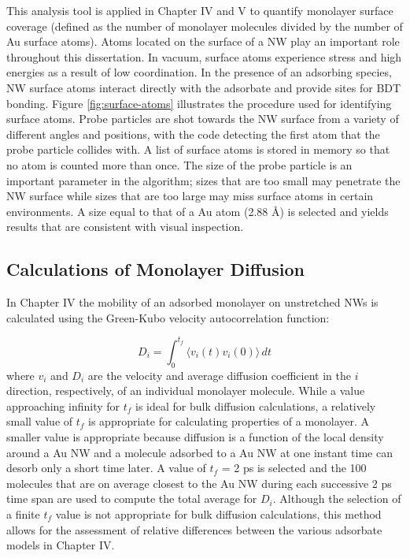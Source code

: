 \documentclass[10pt]{report}  %
\newcommand\findent{\hspace*{\parindent}}
\begin{document}
\findent This analysis tool is applied in Chapter IV and V to quantify monolayer surface coverage (defined as the number of monolayer molecules divided by the number of Au surface atoms). Atoms located on the surface of a NW play an important role throughout this dissertation. In vacuum, surface atoms experience stress and high energies as a result of low coordination. In the presence of an adsorbing species, NW surface atoms interact directly with the adsorbate and provide sites for BDT bonding. Figure \ref{fig:surface-atoms} illustrates the procedure used for identifying surface atoms. Probe particles are shot towards the NW surface from a variety of different angles and positions, with the code detecting the first atom that the probe particle collides with. A list of surface atoms is stored in memory so that no atom is counted more than once. The size of the probe particle is an important parameter in the algorithm; sizes that are too small may penetrate the NW surface while sizes that are too large may miss surface atoms in certain environments. A size equal to that of a Au atom (2.88 \AA) is selected and yields results that are consistent with visual inspection.

\subsection{Calculations of Monolayer Diffusion}

\findent In Chapter IV the mobility of an adsorbed monolayer on unstretched NWs is calculated using the Green-Kubo \cite{Frenkel:2002} velocity autocorrelation function:

\begin{equation}D_i = \int_{0}^{t_f} \! \Big\langle v_i(t)v_i(0) \Big\rangle \, dt\label{diffusion}\end{equation} where $v_i$ and $D_i$ are the velocity and average diffusion coefficient in the $i$ direction, respectively, of an individual monolayer molecule.   While a value approaching infinity for $t_f$ is ideal for bulk diffusion calculations, a relatively small value of $t_f$ is appropriate for calculating properties of a monolayer.  A smaller value is appropriate because diffusion is a function of the local density around a Au NW and a molecule adsorbed to a Au NW at one instant time can desorb only a short time later.  A value of $t_f$ = 2 ps is selected and the 100 molecules that are on average closest to the Au NW during each successive 2 ps time span are used to compute the total average for $D_i$. Although the selection of a finite $t_f$ value is not appropriate for bulk diffusion calculations, this method allows for the assessment of relative differences between the various adsorbate models in Chapter IV.
\end{document}
